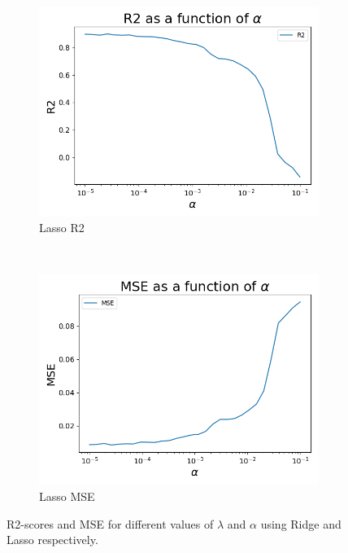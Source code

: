 \documentclass[12pt]{article}
\begin{document}
\begin{figure}[H]
\begin{subfigure}[t]{0.48\textwidth}
\label{figRD:RMSE}
\end{subfigure}
\\
\begin{subfigure}[t]{0.48\textwidth}
\includegraphics[width=\linewidth]{../figures/LassoR2.png}
\caption{Lasso R2}
\label{figRD:LR2}
\end{subfigure}
\
\begin{subfigure}[t]{0.48\textwidth}
\includegraphics[width = \linewidth]{../figures/LassoMSE.png}
\caption{Lasso MSE}
\label{figRD:LMSE}
\end{subfigure}
\caption{R2-scores and MSE for different values of $\lambda$ and $\alpha$ using Ridge and Lasso respectively.}
\label{figRD:RLR2MSE}
\end{figure}
\end{document}
